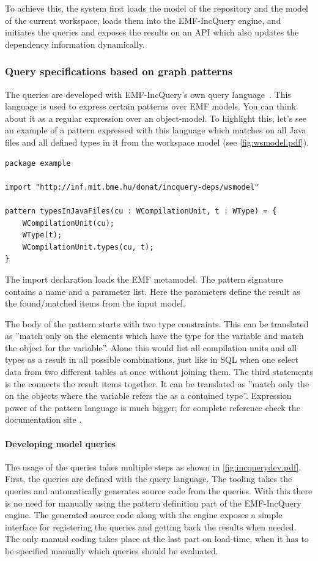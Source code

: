 To achieve this, the system first loads the model of the repository and the 
model of the current workspace, loads them into the EMF-IncQuery engine, 
and initiates the queries and exposes the results on an API which also updates
the dependency information dynamically.
 
\subsubsection{Query specifications based on graph
patterns}\label{sect:patternqueries} The queries are developed with
EMF-IncQuery's own query language~\cite{icmt2011}. This language is used to
express certain patterns over EMF models. You can think about it as a regular
expression over an object-model.
To highlight this, let's see an example of a pattern expressed with this
language which matches on all Java files and all defined types in it from the
workspace model (see \autoref{fig:wsmodel.pdf}).
\begin{lstlisting}
package example

import "http://inf.mit.bme.hu/donat/incquery-deps/wsmodel"

pattern typesInJavaFiles(cu : WCompilationUnit, t : WType) = {
	WCompilationUnit(cu);
	WType(t);
	WCompilationUnit.types(cu, t);
}
\end{lstlisting}

The import declaration loads the EMF metamodel. The pattern signature
contains a name and a parameter list. Here the parameters define the result as
the found/matched items from the input model. 

The body of the pattern starts with two type constraints. This can be translated
as ''match only on the elements which have the  type for
the  variable and match the  object for the 
variable''. Alone this would list all compilation units and all types as a
result in all possible combinations, just like in SQL when one select data from
two different tables at once without joining them. The third statements is the
connects the result items together. It can be translated as ''match only the on
the objects  where the  variable refers the  as a contained
type''. Expression power of the pattern language is much bigger; for complete
reference check the documentation site \cite{EMFIncQuery}.

\paragraph{Developing model queries}
The usage of the queries takes multiple steps as shown in \autoref{fig:incquerydev.pdf}.
First, the queries are defined with the query language. The tooling takes the queries 
and automatically generates source code from the queries. With this there is no need 
for manually using the pattern definition part of the EMF-IncQuery engine. The generated
source code along with the engine exposes a simple interface for registering the
queries and getting back the results when needed. The only manual coding takes place
at the last part on load-time, when it has to be specified manually which queries 
should be evaluated. 

